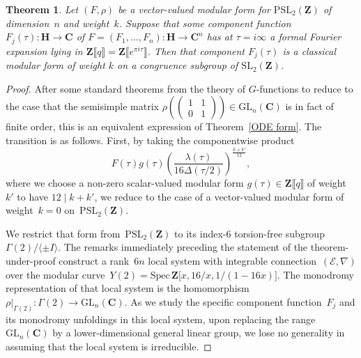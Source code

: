 \documentclass[10pt]{amsart}
\def\PSL{\mathrm{PSL}}
\def\spec{\mathrm{Spec} \,}
\def\Z{\mathbf{Z}}
\def\GL{\mathrm{GL}}
\newtheorem{thm}[subsubsection]{Theorem}
\theoremstyle{remark}
\numberwithin{equation}{subsection}
\def\C{\mathbf{C}}
\def\SL{\mathrm{SL}}
\def\H{\mathbf{H}}
\begin{document}
\begin{thm}  \label{ubd for vvmf}
Let $(F,\rho)$ be a vector-valued modular form for $\PSL_2(\Z)$ of dimension~$n$ and weight~$k$. Suppose that some component function $F_j(\tau) : \H \to \C$ of $F = (F_1, \ldots, F_n) : \H \to \C^n$ has at $\tau = i \infty$
a formal Fourier expansion lying in $\Z\llbracket q \rrbracket = \Z\llbracket e^{\pi i \tau} \rrbracket$. Then that component $F_j(\tau)$ is a classical modular form of weight $k$ on a congruence subgroup of $\SL_2(\Z)$.
\end{thm}

\begin{proof}
After some standard theorems from the theory of $G$-functions to reduce to the case that
the semisimple matrix $\rho \left( \begin{pmatrix} 1 & 1 \\ 0 & 1 \end{pmatrix}  \right) \in \GL_n(\C)$ is in fact
of finite order, this is an equivalent expression of Theorem~\ref{ODE form}. 
The transition is as follows. First, by taking the componentwise product 
$$F(\tau)g(\tau) \left( \frac{\lambda(\tau)} {16\Delta(\tau/2)} \right)^{\frac{k+k'}{12}},$$
 where we choose a non-zero scalar-valued modular form $g(\tau)\in \Z \llbracket q \rrbracket$ of weight $k'$ to have $12 \mid k+k'$,
 we reduce to the case of a vector-valued modular form of weight~$k = 0$ on~$\PSL_2(\Z)$. 
 
We restrict that form from~$\PSL_2(\Z)$ to its index-$6$ torsion-free subgroup~$\Gamma(2) / \langle \pm I \rangle$. The remarks immediately preceding the statement of the theorem-under-proof construct a rank~$6n$ local system with integrable connection~$(\mathcal{E},\nabla)$ over the modular curve~$Y(2) = \spec{\Z[x,16/x,1/(1-16x)}]$. The monodromy representation of that local system is the homomorphism~$\rho|_{\Gamma(2)} : \Gamma(2) \to \GL_n(\C)$. As we study the specific component function~$F_j$ and its monodromy unfoldings in this local system, upon replacing the range~$\GL_n(\C)$ by a lower-dimensional general linear group, we lose no generality in assuming that the local system is irreducible. 
 

\end{proof}
\end{document}
